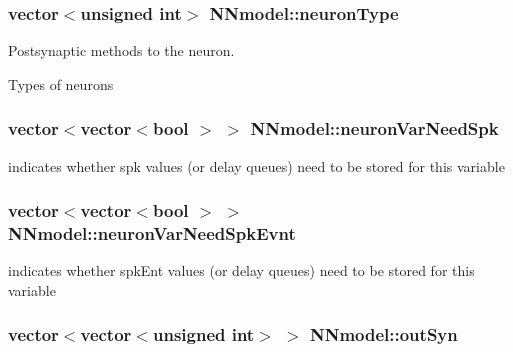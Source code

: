 \hypertarget{classNNmodel_a0e5087ec30e3efb114f8f713759a4abc}{
\subsubsection[{neuron\+Type}]{\setlength{\rightskip}{0pt plus 5cm}vector$<$unsigned int$>$ N\+Nmodel\+::neuron\+Type}}\label{classNNmodel_a0e5087ec30e3efb114f8f713759a4abc}


Postsynaptic methods to the neuron. 

Types of neurons \hypertarget{classNNmodel_a69a2c9a2317316d0eddf4033779f17cc}{
\subsubsection[{neuron\+Var\+Need\+Spk}]{\setlength{\rightskip}{0pt plus 5cm}vector$<$vector$<$bool $>$ $>$ N\+Nmodel\+::neuron\+Var\+Need\+Spk}}\label{classNNmodel_a69a2c9a2317316d0eddf4033779f17cc}


indicates whether spk values (or delay queues) need to be stored for this variable 

\hypertarget{classNNmodel_a6cd30ae92d9eef399beb66098d016774}{
\subsubsection[{neuron\+Var\+Need\+Spk\+Evnt}]{\setlength{\rightskip}{0pt plus 5cm}vector$<$vector$<$bool $>$ $>$ N\+Nmodel\+::neuron\+Var\+Need\+Spk\+Evnt}}\label{classNNmodel_a6cd30ae92d9eef399beb66098d016774}


indicates whether spk\+Ent values (or delay queues) need to be stored for this variable 

\hypertarget{classNNmodel_a6ba57b83448ab23eaa5a68d40b2ceac9}{
\subsubsection[{out\+Syn}]{\setlength{\rightskip}{0pt plus 5cm}vector$<$vector$<$unsigned int$>$ $>$ N\+Nmodel\+::out\+Syn}}\label{classNNmodel_a6ba57b83448ab23eaa5a68d40b2ceac9}


